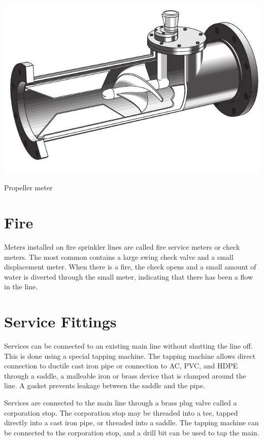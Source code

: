 \documentclass[10pt]{article}
\begin{document}
\includegraphics[max width=\textwidth]{PropellerMeter}

Propeller meter

\section{Fire}
Meters installed on fire sprinkler lines are called fire service meters or check meters. The most common contains a large swing check valve and a small displacement meter. When there is a fire, the check opens and a small amount of water is diverted through the small meter, indicating that there has been a flow in the line.

\section{Service Fittings}
Services can be connected to an existing main line without shutting the line off. This is done using a special tapping machine. The tapping machine allows direct connection to ductile cast iron pipe or connection to AC, PVC, and HDPE through a saddle, a malleable iron or brass device that is clamped around the line. A gasket prevents leakage between the saddle and the pipe.

Services are connected to the main line through a brass plug valve called a corporation stop. The corporation stop may be threaded into a tee, tapped directly into a cast iron pipe, or threaded into a saddle. The tapping machine can be connected to the corporation stop, and a drill bit can be used to tap the main.
\end{document}
